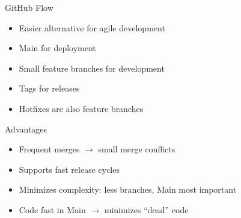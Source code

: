 \begin{frame}{\insertsubsection {}}
	\begin{fancycolumns}[animation=none]
		\begin{definition}{GitHub Flow}
			\begin{itemize}
				\item Easier alternative for agile development
				\item Main for deployment
				\item Small feature branches for development
				\item Tags for releases
				\item Hotfixes are also feature branches
			\end{itemize}
		\end{definition}\pause
		\begin{note}{Advantages}
			\begin{itemize}
				\item Frequent merges $\rightarrow$ small merge conflicts
				\item Supports fast release cycles
				\item Minimizes complexity: less branches, Main most important
				\item Code fast in Main $\rightarrow$ minimizes \enquote{dead} code
			\end{itemize}
		\end{note}
		\nextcolumn
	\end{fancycolumns}
\end{frame}
	


       	